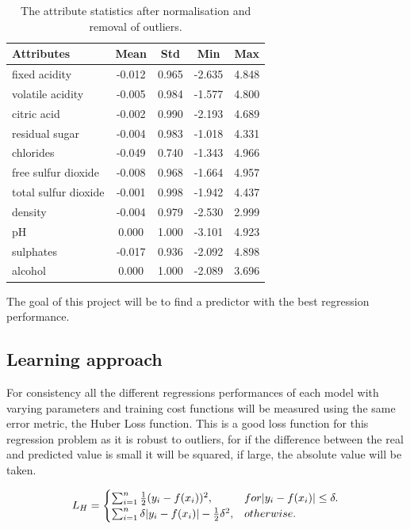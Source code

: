 \documentclass[10pt,twocolumn,letterpaper]{article}
\DeclarePairedDelimiter\abs{\lvert}{\rvert}%
\begin{document}
\begin{table}[h]
	\begin{center}
		\begin{tabular}{|l|c|c|c|c|}
			\hline
			Attributes & Mean & Std & Min & Max \\
			\hline
			fixed acidity & -0.012 & 0.965 & -2.635 & 4.848 \\
			volatile acidity & -0.005 & 0.984 & -1.577 & 4.800 \\
			citric acid & -0.002 & 0.990 & -2.193 & 4.689 \\
			residual sugar & -0.004 & 0.983 & -1.018 & 4.331 \\
			chlorides & -0.049 & 0.740 & -1.343 & 4.966 \\
			free sulfur dioxide & -0.008 & 0.968 & -1.664 & 4.957 \\
			total sulfur dioxide & -0.001 & 0.998 & -1.942 & 4.437 \\
			density & -0.004 & 0.979 & -2.530 & 2.999 \\
			pH & 0.000 & 1.000 & -3.101 & 4.923 \\
			sulphates & -0.017 & 0.936 & -2.092 & 4.898 \\
			alcohol & 0.000 & 1.000 & -2.089 & 3.696 \\ 
			\hline
		\end{tabular}
	\end{center}
	\caption{The attribute statistics after normalisation and removal of outliers.}
	\label{tab:normalised}
\end{table}

The goal of this project will be to find a predictor with the best regression performance.

\subsection{Learning approach}

For consistency all the different regressions performances of each model with varying parameters and training cost functions will be measured using the same error metric, the Huber Loss function. This is a good loss function for this regression problem as it is robust to outliers, for if the difference between the real and predicted value is small it will be squared, if large, the absolute value will be taken.

\begin{equation}
L_H = \begin{cases}
\sum_{i = 1}^{n} \frac{1}{2} (y_i - f(x_i))^2, & for \abs{y_i - f(x_i)} \leq \delta. \\
\sum_{i = 1}^{n} \delta \abs{y_i - f(x_i)} - \frac{1}{2} \delta^2, & otherwise.
\end{cases}
\end{equation}
\end{document}
